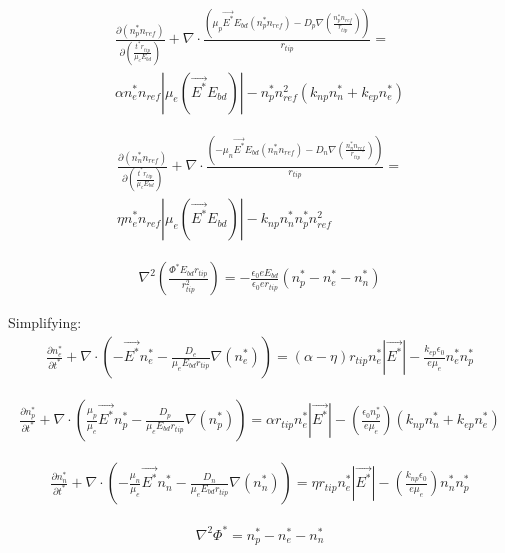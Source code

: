 \documentclass[12pt, a4paper]{report}
\begin{document}
\begin{align*}
    \frac{\partial (n_p^* n_{ref})}{\partial \left(\frac{t^*r_{tip}}{\mu_e E_{bd}}  \right)} + \nabla \cdot\frac{\left(\mu_p\vec{E^*}E_{bd}(n_p^*n_{ref}) - D_p\nabla \left(\frac{n_p^* n_{ref}}{r_{tip}}  \right) \right)}{r_{tip}} = \\ \alpha n_e^*n_{ref} |\mu_e(\vec{E^*}E_{bd})| - n_p^*n_{ref}^2\left(k_{np}n_n^* + k_{ep}n_e^*\right)
\end{align*}

\begin{align*}
    \frac{\partial (n_n^* n_{ref})}{\partial \left(\frac{t^*r_{tip}}{\mu_e E_{bd}}  \right)} + \nabla \cdot\frac{\left(-\mu_n\vec{E^*}E_{bd}(n_n^*n_{ref}) - D_n\nabla \left(\frac{n_n^* n_{ref}}{r_{tip}}  \right) \right)}{r_{tip}} = \\ \eta n_e^*n_{ref}|\mu_e(\vec{E^*}E_{bd})| - k_{np}n_n^*n_p^*n_{ref}^2
\end{align*}

\begin{align*}
    \nabla^2 \left(\frac{\Phi^*E_{bd}r_{tip}}{r_{tip}^2}\right) = -\frac{\epsilon_0 e E_{bd}}{\epsilon_0 e r_{tip}} (n_p^*-n_e^*-n_n^*)
\end{align*}

\noindent
Simplifying:
\begin{align*}
        \frac{\partial n_e^* }{\partial t^*} + \nabla \cdot \left(-\vec{E^*}n_e^* - \frac{{D_e}}{\mu_e E_{bd}r_{tip}}\nabla (n_e^*)\right) = (\alpha - \eta)r_{tip} n_e^*|\vec{E^*}| - \frac{k_{ep} \epsilon_0}{e \mu_e} n_e^*n_p^*
\end{align*}

\begin{align*}
        \frac{\partial n_p^* }{\partial t^*} + \nabla \cdot \left(\frac{\mu_p}{\mu_e} \vec{E^*}n_p^* - \frac{{D_p}}{\mu_e E_{bd}r_{tip}}\nabla (n_p^*)\right) = \alpha r_{tip} n_e^*|\vec{E^*}| - \left(\frac{\epsilon_0 n_p^*}{e \mu_e} \right) \left(k_{np}n_n^* + k_{ep}n_e^*\right)
\end{align*}

\begin{align*}
        \frac{\partial n_n^* }{\partial t^*} + \nabla \cdot \left(-\frac{\mu_n}{\mu_e} \vec{E^*}n_n^* - \frac{{D_n}}{\mu_e E_{bd}r_{tip}}\nabla (n_n^*)\right) = \eta r_{tip} n_e^*|\vec{E^*}| - \left(\frac{k_{np} \epsilon_0}{e \mu_e} \right) n_n^*n_p^*
\end{align*}

\begin{align*}
    \nabla^2\Phi^* = n_p^*-n_e^*-n_n^*
\end{align*}
\end{document}
